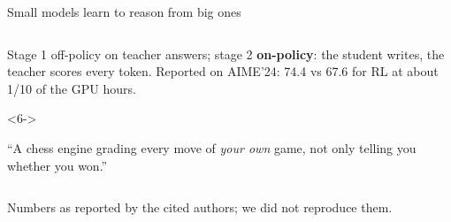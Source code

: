 \begin{frame}{Small models learn to reason from big ones\hfill\est\ }
\begin{columns}[T]
\begin{column}{0.53\textwidth}
\begin{uncoverenv}
\begin{tcolorbox}[enhanced,colback=white,colframe=kdteal,boxrule=0.5pt,arc=2pt,
          left=4pt,right=4pt,top=2pt,bottom=2pt,title={Qwen3 (2025)},
          fonttitle=\bfseries\scriptsize,colbacktitle=kdteal]
        Stage 1 off-policy on teacher answers; stage 2 \textbf{on-policy}:
        the student writes, the teacher scores every token. Reported on
        AIME'24: 74.4 vs 67.6 for RL at about 1/10 of the GPU hours.
      \end{tcolorbox}
      \end{uncoverenv}
      \vspace{-0.1cm}
      \begin{uncoverenv}<6->
      \begin{tcolorbox}[enhanced,colback=white,colframe=kdgray,boxrule=0.5pt,arc=2pt,
          left=4pt,right=4pt,top=2pt,bottom=2pt,title={Thinking Machines Lab (2025)},
          fonttitle=\bfseries\scriptsize,colbacktitle=kdgray]
        ``A chess engine grading every move of \emph{your own} game,
        not only telling you whether you won.''
      \end{tcolorbox}
      \end{uncoverenv}
    \end{column}
  \end{columns}
  \vspace{0.05cm}
  {\tiny\color{kdgray} Numbers as reported by the cited authors; we did not reproduce them.}
\end{frame}

